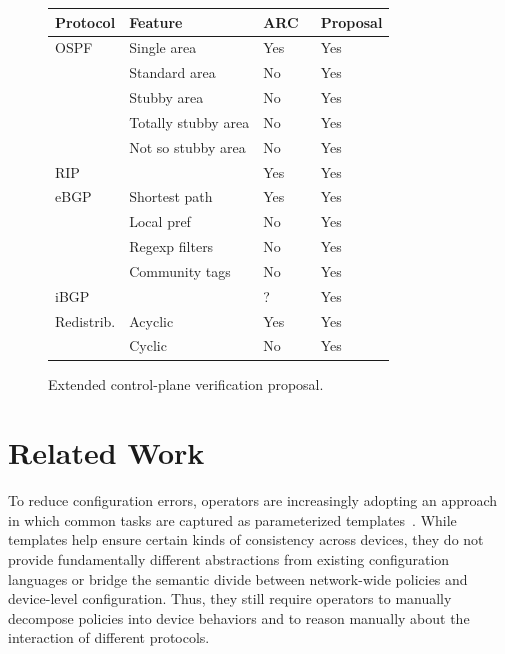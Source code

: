 \begin{figure}
  \centering
  \small
  \begin{tabular}{|l|l|l|l|}
\hline
Protocol & Feature & ARC~\cite{arc} & Proposal \\\hline
OSPF & Single area & Yes & Yes \\
& Standard area & No & Yes \\
& Stubby area  & No & Yes \\
& Totally stubby area  & No & Yes \\
& Not so stubby area  & No & Yes \\\hline
RIP & & Yes & Yes \\\hline
eBGP & Shortest path &  Yes & Yes \\
  & Local pref & No & Yes \\
  & Regexp filters &  No & Yes \\
  & Community tags & No & Yes \\\hline
iBGP & & ? & Yes \\\hline
Redistrib. & Acyclic & Yes & Yes \\
  & Cyclic & No & Yes \\
\hline
  \end{tabular}
\caption{Extended control-plane verification proposal.}
\label{fig:smt-vs-arc}
\end{figure}

\section{Related Work}

To reduce configuration errors, operators are increasingly adopting an
approach in which common tasks are captured as parameterized templates~\cite{hatch,thwack}.
%
%
While templates help ensure certain kinds of consistency across devices,
they do not provide fundamentally different abstractions from existing configuration languages
or bridge the semantic divide between network-wide policies and device-level configuration.
Thus, they still require operators to
manually decompose policies into device behaviors and to reason manually about the interaction of different
protocols.

